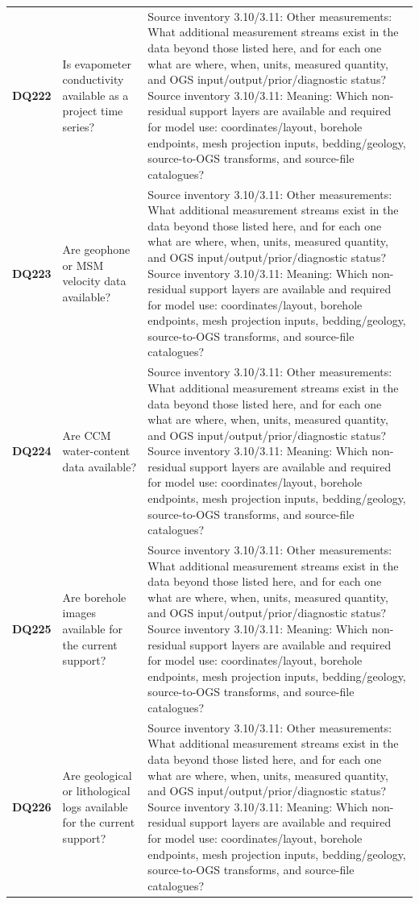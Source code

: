 \begin{longtable}{@{}L{0.09\textwidth} L{0.31\textwidth} L{0.52\textwidth}@{}}
\addlinespace[0.18em]
\textbf{DQ222} & Is evapometer conductivity available as a project time series? & Source inventory 3.10/3.11: Other measurements: What additional measurement streams exist in the data beyond those listed here, and for each one what are where, when, units, measured quantity, and OGS input/output/prior/diagnostic status? Source inventory 3.10/3.11: Meaning: Which non-residual support layers are available and required for model use: coordinates/layout, borehole endpoints, mesh projection inputs, bedding/geology, source-to-OGS transforms, and source-file catalogues?\\
\addlinespace[0.18em]
\textbf{DQ223} & Are geophone or MSM velocity data available? & Source inventory 3.10/3.11: Other measurements: What additional measurement streams exist in the data beyond those listed here, and for each one what are where, when, units, measured quantity, and OGS input/output/prior/diagnostic status? Source inventory 3.10/3.11: Meaning: Which non-residual support layers are available and required for model use: coordinates/layout, borehole endpoints, mesh projection inputs, bedding/geology, source-to-OGS transforms, and source-file catalogues?\\
\addlinespace[0.18em]
\textbf{DQ224} & Are CCM water-content data available? & Source inventory 3.10/3.11: Other measurements: What additional measurement streams exist in the data beyond those listed here, and for each one what are where, when, units, measured quantity, and OGS input/output/prior/diagnostic status? Source inventory 3.10/3.11: Meaning: Which non-residual support layers are available and required for model use: coordinates/layout, borehole endpoints, mesh projection inputs, bedding/geology, source-to-OGS transforms, and source-file catalogues?\\
\addlinespace[0.18em]
\textbf{DQ225} & Are borehole images available for the current support? & Source inventory 3.10/3.11: Other measurements: What additional measurement streams exist in the data beyond those listed here, and for each one what are where, when, units, measured quantity, and OGS input/output/prior/diagnostic status? Source inventory 3.10/3.11: Meaning: Which non-residual support layers are available and required for model use: coordinates/layout, borehole endpoints, mesh projection inputs, bedding/geology, source-to-OGS transforms, and source-file catalogues?\\
\addlinespace[0.18em]
\textbf{DQ226} & Are geological or lithological logs available for the current support? & Source inventory 3.10/3.11: Other measurements: What additional measurement streams exist in the data beyond those listed here, and for each one what are where, when, units, measured quantity, and OGS input/output/prior/diagnostic status? Source inventory 3.10/3.11: Meaning: Which non-residual support layers are available and required for model use: coordinates/layout, borehole endpoints, mesh projection inputs, bedding/geology, source-to-OGS transforms, and source-file catalogues?\\

\end{longtable}
